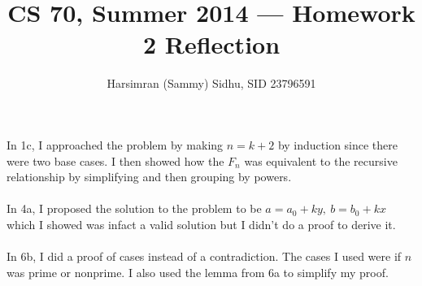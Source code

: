 \documentclass[11pt,letterpaper]{article}
\title{CS 70, Summer 2014 --- Homework 2 Reflection} %
\author{Harsimran (Sammy) Sidhu, SID 23796591} %
\begin{document}
\maketitle

In 1c, I approached the problem by making $n=k+2$ by induction since there were two base cases. I then showed how the $F_n$ was equivalent to the recursive relationship by simplifying and then grouping by powers.\\
\\
In 4a, I proposed the solution to the problem to be $a=a_0 + ky, ~b=b_0+kx$ which I showed was infact a valid solution but I didn't do a proof to derive it.\\
\\
In 6b, I did a proof of cases instead of a contradiction. The cases I used were if $n$ was prime or nonprime. I also used the lemma from 6a to simplify my proof.\\ 
\end{document}
